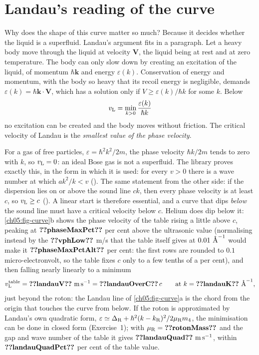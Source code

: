 \section{Landau's reading of the curve}\label{ch05:sec-landau}

Why does the shape of this curve matter so much?
Because it decides whether the liquid is a superfluid.
Landau's argument fits in a paragraph.
Let a heavy body move through the liquid at velocity $\mathbf V$, the liquid being at rest and at zero temperature.
The body can only slow down by creating an excitation of the liquid, of momentum $\hbar\mathbf k$ and energy $\varepsilon(k)$.
Conservation of energy and momentum, with the body so heavy that its recoil energy is negligible, demands $\varepsilon(k)=\hbar\mathbf k\cdot\mathbf V$, which has a solution only if $V\ge\varepsilon(k)/\hbar k$ for some $k$.
Below
\begin{equation}\label{ch05:eq-landau}
 v_{\rm L}=\min_{k>0}\frac{\varepsilon(k)}{\hbar k}
\end{equation}
no excitation can be created and the body moves without friction.
The critical velocity of Landau is the \emph{smallest value of the phase velocity}.

For a gas of free particles, $\varepsilon=\hbar^2k^2/2m$, the phase velocity $\hbar k/2m$ tends to zero with $k$, so $v_{\rm L}=0$: an ideal Bose gas is not a superfluid.
The library proves exactly this, in the form in which it is used: for every $v>0$ there is a wave number at which $a k^2/k<v$ ().
The same statement from the other side: if the dispersion lies on or above the sound line $ck$, then every phase velocity is at least $c$, so $v_{\rm L}\ge c$ ().
A linear start is therefore essential, and a curve that dips \emph{below} the sound line must have a critical velocity below $c$.
Helium does dip below it: \cref{ch05:fig-curve}b shows the phase velocity of the table rising a little above $c$, peaking at $\cfiveV{phaseMaxPct}$ per cent above the ultrasonic value (normalising instead by the $\cfiveV{vphLow}$ m/s that the table itself gives at $0.01\ \text{\AA}^{-1}$ would make it $\cfiveV{phaseMaxPctAlt}$ per cent: the first rows are rounded to $0.1$ micro-electronvolt, so the table fixes $c$ only to a few tenths of a per cent), and then falling nearly linearly to a minimum
\begin{equation}
 v_{\rm L}^{\rm table}=\cfiveV{landauV}\ \mathrm{m\,s^{-1}}=\cfiveV{landauOverC}\,c\qquad\text{at } k=\cfiveV{landauK}\ \cfiveAng^{-1},
\end{equation}
just beyond the roton: the Landau line of \cref{ch05:fig-curve}a is the chord from the origin that touches the curve from below.
If the roton is approximated by Landau's own quadratic form, $\varepsilon\simeq\Delta_{\rm R}+\hbar^2(k-k_{\rm R})^2/2\mu_{\rm R}m_4$, the minimisation can be done in closed form (Exercise~1); with $\mu_{\rm R}=\cfiveV{rotonMass}$ and the gap and wave number of the table it gives $\cfiveV{landauQuad}\ \mathrm{m\,s^{-1}}$, within $\cfiveV{landauQuadPct}$ per cent of the table value.

